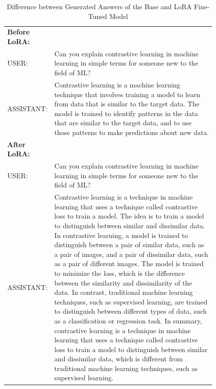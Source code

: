 \begin{table}[h!]
	\caption{Difference between Generated Answers of the Base and LoRA Fine-Tuned Model} \vspace{0.25em}
	\centering
	\renewcommand{\arraystretch}{1.2} %
	\begin{tabular}{@{}lp{0.85\linewidth}@{}}
		\hline
		\textbf{Before LoRA:} & \\
		USER: & Can you explain contrastive learning in machine learning in simple terms for someone new to the field of ML? \\
		ASSISTANT: & Contrastive learning is a machine learning technique that involves training a model to learn from data that is similar to the target data. The model is trained to identify patterns in the data that are similar to the target data, and to use those patterns to make predictions about new data. \\
		\hline
		\textbf{After LoRA:} & \\
		USER: & Can you explain contrastive learning in machine learning in simple terms for someone new to the field of ML? \\
		ASSISTANT: & Contrastive learning is a technique in machine learning that uses a technique called contrastive loss to train a model. The idea is to train a model to distinguish between similar and dissimilar data. In contrastive learning, a model is trained to distinguish between a pair of similar data, such as a pair of images, and a pair of dissimilar data, such as a pair of different images. The model is trained to minimize the loss, which is the difference between the similarity and dissimilarity of the data. In contrast, traditional machine learning techniques, such as supervised learning, are trained to distinguish between different types of data, such as a classification or regression task. In summary, contrastive learning is a technique in machine learning that uses a technique called contrastive loss to train a model to distinguish between similar and dissimilar data, which is different from traditional machine learning techniques, such as supervised learning. \\
		\hline
	\end{tabular}
\end{table}
